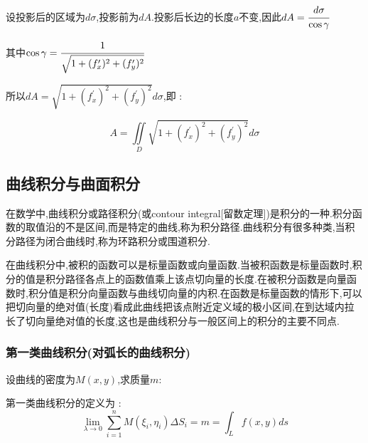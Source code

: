\documentclass[UTF8,12pt]{ctexbook}
\newcommand{\limNormal}[1]{\lim\limits_{#1}}
\newcommand{\derivative}{^\prime}
\newcommand{\upDownSum}[2]{\sum\limits_{#2}^{#1}}
\newcommand{\defFunction}[1]{f(#1)}
\newcommand{\doubleIntegralOnZone}[1]{\iint\limits_{#1}}
\newcommand{\pathIntegral}[1]{\int_{#1}}
\begin{document}
{{{{    设投影后的区域为$d\sigma$,投影前为$dA$.投影后长边的长度$a$不变,因此$dA = \cfrac{d\sigma}{\cos\gamma}$

    其中$\cos\gamma = \cfrac{1}{\sqrt{1 + (f\derivative_x)^2 + (f\derivative_y)^2}}$

    所以$dA = \sqrt{1 + (f\derivative_x)^2 + (f\derivative_y)^2}d\sigma$,即 :

    $$
      A = \doubleIntegralOnZone{D}\sqrt{1 + (f\derivative_x)^2 + (f\derivative_y)^2}d\sigma
    $$
  }%


}%

\subsection{曲线积分与曲面积分}{
  在数学中,曲线积分或路径积分(或contour integral[留数定理])是积分的一种.积分函数的取值沿的不是区间,而是特定的曲线,称为积分路径.曲线积分有很多种类,当积分路径为闭合曲线时,称为环路积分或围道积分.

  在曲线积分中,被积的函数可以是标量函数或向量函数.当被积函数是标量函数时,积分的值是积分路径各点上的函数值乘上该点切向量的长度.在被积分函数是向量函数时,积分值是积分向量函数与曲线切向量的内积.在函数是标量函数的情形下,可以把切向量的绝对值(长度)看成此曲线把该点附近定义域的极小区间,在到达域内拉长了切向量绝对值的长度,这也是曲线积分与一般区间上的积分的主要不同点.

  \subsubsection{第一类曲线积分(对弧长的曲线积分)}{
    设曲线的密度为$M(x,y)$,求质量$m$:

    \begin{center}
    \end{center}

    第一类曲线积分的定义为 :
    $$
      \limNormal{\lambda \to 0}\upDownSum{n}{i = 1}M(\xi_i,\eta_i)\Delta S_i = m = \pathIntegral{L}\defFunction{x,y}ds
    $$

}}}}
\end{document}
